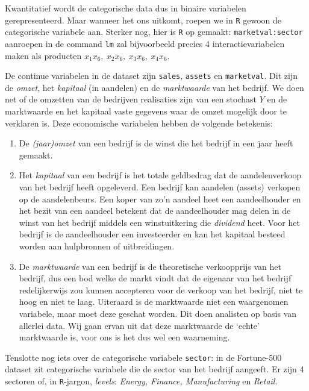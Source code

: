 \documentclass[a4paper]{report}
\begin{document}
  Kwantitatief wordt de categorische data dus in binaire variabelen gerepresenteerd. Maar wanneer het ons uitkomt, roepen we in \verb!R! gewoon de categorische variabele aan. Sterker nog, hier is \verb!R! op gemaakt: \verb!marketval:sector! aanroepen in de command \verb!lm! zal bijvoorbeeld precies 4 interactievariabelen maken als producten $x_1x_6, \ x_2x_6, \ x_3x_6, \ x_4x_6$.
  
  De continue variabelen in de dataset zijn \verb!sales!, \verb!assets! en \verb!marketval!. Dit zijn de \emph{omzet}, het \emph{kapitaal} (in aandelen) en de \emph{marktwaarde} van het bedrijf. We doen net of de omzetten van de bedrijven realisaties zijn van een stochast $Y$ en de marktwaarde en het kapitaal vaste gegevens waar de omzet mogelijk door te verklaren is. Deze economische variabelen hebben de volgende betekenis:

\begin{enumerate}
  \item De \emph{(jaar)omzet} van een bedrijf is de winst die het bedrijf in een jaar heeft gemaakt.
  \item Het \emph{kapitaal} van een bedrijf is het totale geldbedrag dat de aandelenverkoop van het bedrijf heeft opgeleverd. Een bedrijf kan aandelen (assets) verkopen op de aandelenbeurs. Een koper van zo'n aandeel heet een aandeelhouder en het bezit van een aandeel betekent dat de aandeelhouder mag delen in de winst van het bedrijf middels een winstuitkering die \emph{dividend} heet. Voor het bedrijf is de aandeelhouder een investeerder en kan het kapitaal besteed worden aan hulpbronnen of uitbreidingen.
  \item De \emph{marktwaarde} van een bedrijf is de theoretische verkoopprijs van het bedrijf, dus een bod welke de markt vindt dat de eigenaar van het bedrijf redelijkerwijs zou kunnen accepteren voor de verkoop van het bedrijf, niet te hoog en niet te laag. Uiteraard is de marktwaarde niet een waargenomen variabele, maar moet deze geschat worden. Dit doen analisten op basis van allerlei data. Wij gaan ervan uit dat deze marktwaarde de `echte' marktwaarde is, voor ons is het dus wel een waarneming.
\end{enumerate}

  Tenslotte nog iets over de categorische variabele \verb!sector!: in de Fortune-500 dataset zit categorische variabele die de sector van het bedrijf aangeeft. Er zijn 4 sectoren of, in \verb!R!-jargon, \emph{levels}: \emph{Energy, Finance, Manufacturing} en \emph{Retail}. 
  
\end{document}
